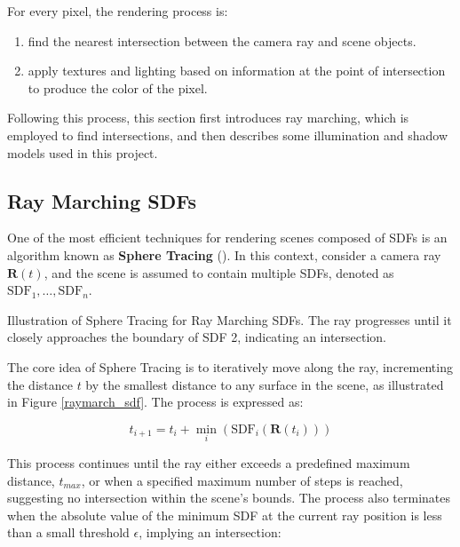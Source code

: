 For every pixel, the rendering process is:
\begin{enumerate}
    \item find the nearest intersection between the camera ray and scene objects.
    \item apply textures and lighting based on information at the point of intersection to produce the color of the pixel.
\end{enumerate}

Following this process, this section first introduces ray marching, which is employed to find intersections, and then describes some illumination and shadow models used in this project.

\subsection{Ray Marching SDFs}
\label{Raymarching SDFs}

One of the most efficient techniques for rendering scenes composed of SDFs is an algorithm known as \textbf{Sphere Tracing} (). In this context, consider a camera ray $\mathbf{R}(t)$, and the scene is assumed to contain multiple SDFs, denoted as $\text{SDF}_1, \dots, \text{SDF}_n$.

{Illustration of Sphere Tracing for Ray Marching SDFs. 
The ray progresses until it closely approaches the boundary of SDF 2, indicating an intersection. }{}

The core idea of Sphere Tracing is to iteratively move along the ray, incrementing the distance $t$ by the smallest distance to any surface in the scene, as illustrated in Figure \ref{raymarch_sdf}. The process is expressed as:

\begin{equation}
    t_{i+1} = t_{i} + \min_i(\text{SDF}_i(\mathbf{R}(t_i)))
\end{equation}

This process continues until the ray either exceeds a predefined maximum distance, $t_{max}$, or when a specified maximum number of steps is reached, suggesting no intersection within the scene's bounds. The process also terminates when the absolute value of the minimum SDF at the current ray position is less than a small threshold $\epsilon$, implying an intersection:

